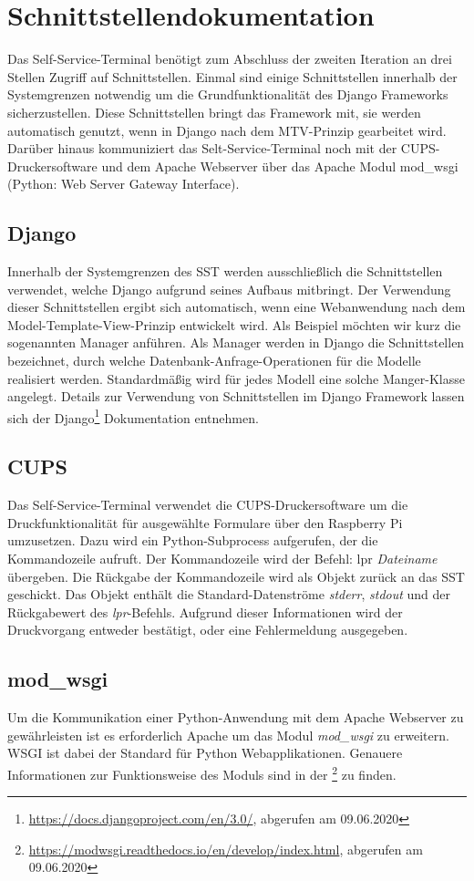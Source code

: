 \section{Schnittstellendokumentation}
Das Self-Service-Terminal benötigt zum Abschluss der zweiten Iteration an drei Stellen Zugriff auf Schnittstellen. Einmal sind einige Schnittstellen innerhalb der Systemgrenzen notwendig um die Grundfunktionalität des Django Frameworks sicherzustellen. Diese Schnittstellen bringt das Framework mit, sie werden automatisch genutzt, wenn in Django nach dem MTV-Prinzip gearbeitet wird. Darüber hinaus kommuniziert das Selt-Service-Terminal noch mit der CUPS-Druckersoftware und dem Apache Webserver über das Apache Modul mod\_wsgi (Python: Web Server Gateway Interface).
\subsection{Django}
Innerhalb der Systemgrenzen des SST werden ausschließlich die Schnittstellen verwendet, welche Django aufgrund seines Aufbaus mitbringt. Der Verwendung dieser Schnittstellen ergibt sich automatisch, wenn eine Webanwendung nach dem Model-Template-View-Prinzip entwickelt wird. Als Beispiel möchten wir kurz die sogenannten \glqq Manager\grqq{} anführen. Als Manager werden in Django die Schnittstellen bezeichnet, durch welche Datenbank-Anfrage-Operationen für die Modelle realisiert werden. Standardmäßig wird für jedes Modell eine solche Manger-Klasse angelegt. Details zur Verwendung von Schnittstellen im Django Framework lassen sich der Django\footnote{\href{https://docs.djangoproject.com/en/3.0/}{https://docs.djangoproject.com/en/3.0/}, abgerufen am 09.06.2020} Dokumentation entnehmen.

\subsection{CUPS}
Das Self-Service-Terminal verwendet die CUPS-Druckersoftware um die Druckfunktionalität für ausgewählte Formulare über den Raspberry Pi umzusetzen. Dazu wird ein Python-Subprocess aufgerufen, der die Kommandozeile aufruft. Der Kommandozeile wird der Befehl: lpr \textit{Dateiname} übergeben. Die Rückgabe der Kommandozeile wird als Objekt zurück an das SST geschickt. Das Objekt enthält die Standard-Datenströme \textit{stderr}, \textit{stdout} und der Rückgabewert des \textit{lpr}-Befehls. Aufgrund dieser Informationen wird der Druckvorgang entweder bestätigt, oder eine Fehlermeldung ausgegeben. 
\subsection{mod\_wsgi}
Um die Kommunikation einer Python-Anwendung mit dem Apache Webserver zu gewährleisten ist es erforderlich Apache um das Modul \textit{mod\_wsgi} zu erweitern. WSGI ist dabei der Standard für Python Webapplikationen. Genauere Informationen zur Funktionsweise des Moduls sind in der \footnote{\href{https://modwsgi.readthedocs.io/en/develop/index.html}{https://modwsgi.readthedocs.io/en/develop/index.html}, abgerufen am 09.06.2020} zu finden.
